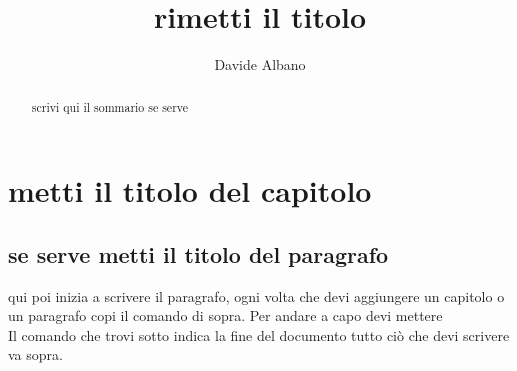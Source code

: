\documentclass[Lau, binding=0.6cm, twoside]{sapthesis}
\title{rimetti il titolo}
\author{Davide Albano}
\begin{document}
\maketitle
\dedication{scrivi qui la dedica se la vuoi senno togli la riga del comando}
\begin{abstract}
scrivi qui il sommario se serve
\end{abstract}
\tableofcontents

\chapter{metti il titolo del capitolo}
\section{se serve metti il titolo del paragrafo}
qui poi inizia a scrivere il paragrafo, ogni volta che devi aggiungere un capitolo o un paragrafo copi il comando di sopra. 
Per andare a capo devi mettere \\ 
Il comando che trovi sotto indica la fine del documento tutto ciò che devi scrivere va sopra.
\end{document}
